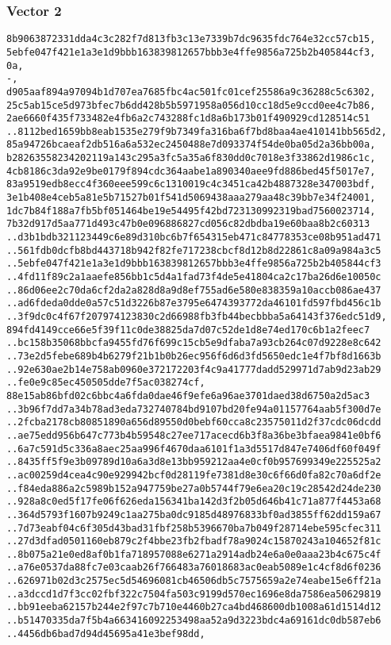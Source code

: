 \documentclass[
]{article}
\begin{document}
\hypertarget{vector-2-2}{%
\subsubsection{Vector 2}\label{vector-2-2}}

\begin{verbatim}
8b9063872331dda4c3c282f7d813fb3c13e7339b7dc9635fdc764e32cc57cb15,
5ebfe047f421e1a3e1d9bbb163839812657bbb3e4ffe9856a725b2b405844cf3,
0a,
-,
d905aaf894a97094b1d707ea7685fbc4ac501fc01cef25586a9c36288c5c6302,
25c5ab15ce5d973bfec7b6dd428b5b5971958a056d10cc18d5e9ccd0ee4c7b86,
2ae6660f435f733482e4fb6a2c743288fc1d8a6b173b01f490929cd128514c51
..8112bed1659bb8eab1535e279f9b7349fa316ba6f7bd8baa4ae410141bb565d2,
85a94726bcaeaf2db516a6a532ec2450488e7d093374f54de0ba05d2a36bb00a,
b28263558234202119a143c295a3fc5a35a6f830dd0c7018e3f33862d1986c1c,
4cb8186c3da92e9be0179f894cdc364aabe1a890340aee9fd886bed45f5017e7,
83a9519edb8ecc4f360eee599c6c1310019c4c3451ca42b4887328e347003bdf,
3e1b408e4ceb5a81e5b71527b01f541d5069438aaa279aa48c39bb7e34f24001,
1dc7b84f188a7fb5bf051464be19e54495f42bd723130992319bad7560023714,
7b32d917d5aa771d493c47b0e096886827cd056c82dbdba19e60baa8b2c60313
..d3b1bdb321123449c6e89d310bc6b7f654315eb471c84778353ce08b951ad471
..561fdb0dcfb8bd443718b942f82fe717238cbcf8d12b8d22861c8a09a984a3c5
..5ebfe047f421e1a3e1d9bbb163839812657bbb3e4ffe9856a725b2b405844cf3
..4fd11f89c2a1aaefe856bb1c5d4a1fad73f4de5e41804ca2c17ba26d6e10050c
..86d06ee2c70da6cf2da2a828d8a9d8ef755ad6e580e838359a10accb086ae437
..ad6fdeda0dde0a57c51d3226b87e3795e6474393772da46101fd597fbd456c1b
..3f9dc0c4f67f207974123830c2d66988fb3fb44becbbba5a64143f376edc51d9,
894fd4149cce66e5f39f11c0de38825da7d07c52de1d8e74ed170c6b1a2feec7
..bc158b35068bbcfa9455fd76f699c15cb5e9dfaba7a93cb264c07d9228e8c642
..73e2d5febe689b4b6279f21b1b0b26ec956f6d6d3fd5650edc1e4f7bf8d1663b
..92e630ae2b14e758ab0960e372172203f4c9a41777dadd529971d7ab9d23ab29
..fe0e9c85ec450505dde7f5ac038274cf,
88e15ab86bfd02c6bbc4a6fda0dae46f9efe6a96ae3701daed38d6750a2d5ac3
..3b96f7dd7a34b78ad3eda732740784bd9107bd20fe94a01157764aab5f300d7e
..2fcba2178cb80851890a656d89550d0bebf60cca8c23575011d2f37cdc06dcdd
..ae75edd956b647c773b4b59548c27ee717acecd6b3f8a36be3bfaea9841e0bf6
..6a7c591d5c336a8aec25aa996f4670daa6101f1a3d5517d847e7406df60f049f
..8435ff5f9e3b09789d10a6a3d8e13bb959212aa4e0cf0b957699349e225525a2
..ac00259d4cea4c90e929942bcf0d28119fe7381d8e30c6f66d0fa82c70a6df2e
..f84eda886a2c5989b152a947759be27a0b5744f79e6ea20c19c28542d24de230
..928a8c0ed5f17fe06f626eda156341ba142d3f2b05d646b41c71a877f4453a68
..364d5793f1607b9249c1aa275ba0dc9185d48976833bf0ad3855ff62dd159a67
..7d73eabf04c6f305d43bad31fbf258b5396670ba7b049f28714ebe595cfec311
..27d3dfad0501160eb879c2f4bbe23fb2fbadf78a9024c15870243a104652f81c
..8b075a21e0ed8af0b1fa718957088e6271a2914adb24e6a0e0aaa23b4c675c4f
..a76e0537da88fc7e03caab26f766483a76018683ac0eab5089e1c4cf8d6f0236
..626971b02d3c2575ec5d54696081cb46506db5c7575659a2e74eabe15e6ff21a
..a3dccd1d7f3cc02fbf322c7504fa503c9199d570ec1696e8da7586ea50629819
..bb91eeba62157b244e2f97c7b710e4460b27ca4bd468600db1008a61d1514d12
..b51470335da7f5b4a663416092253498aa52a9d3223bdc4a69161dc0db587eb6
..4456db6bad7d94d45695a41e3bef98dd,
\end{verbatim}
\end{document}
